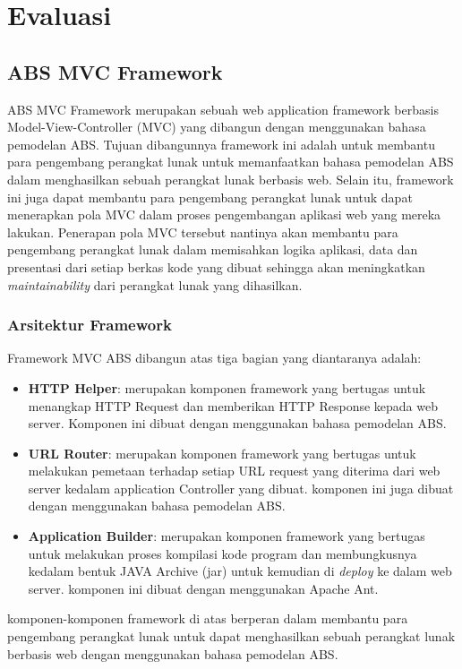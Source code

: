 \chapter{Evaluasi}

\section{ABS MVC Framework}
ABS MVC Framework merupakan sebuah web application framework berbasis Model-View-Controller (MVC) yang dibangun dengan menggunakan bahasa pemodelan ABS. Tujuan dibangunnya framework ini adalah untuk membantu para pengembang perangkat lunak untuk memanfaatkan bahasa pemodelan ABS dalam menghasilkan sebuah perangkat lunak berbasis web. Selain itu, framework ini juga dapat membantu para pengembang perangkat lunak untuk dapat menerapkan pola MVC dalam proses pengembangan aplikasi web yang mereka lakukan. Penerapan pola MVC tersebut nantinya akan membantu para pengembang perangkat lunak dalam memisahkan logika aplikasi, data dan presentasi dari setiap berkas kode yang dibuat sehingga akan meningkatkan \textit{maintainability} dari perangkat lunak yang dihasilkan.

\subsection{Arsitektur Framework}
Framework MVC ABS dibangun atas tiga bagian yang diantaranya adalah:
\begin{itemize}
    \item \textbf{HTTP Helper}: merupakan komponen framework yang bertugas untuk menangkap HTTP Request dan memberikan HTTP Response kepada web server. Komponen ini dibuat dengan menggunakan bahasa pemodelan ABS.
    \item \textbf{URL Router}: merupakan komponen framework yang bertugas untuk melakukan pemetaan terhadap setiap URL request yang diterima dari web server kedalam application Controller yang dibuat. komponen ini juga dibuat dengan menggunakan bahasa pemodelan ABS.
    \item \textbf{Application Builder}: merupakan komponen framework yang bertugas untuk melakukan proses kompilasi kode program dan membungkusnya kedalam bentuk JAVA Archive (jar) untuk kemudian di \textit{deploy} ke dalam web server. komponen ini dibuat dengan menggunakan Apache Ant.
\end{itemize}

\noindent
komponen-komponen framework di atas berperan dalam membantu para pengembang perangkat lunak untuk dapat menghasilkan sebuah perangkat lunak berbasis web dengan menggunakan bahasa pemodelan ABS.

